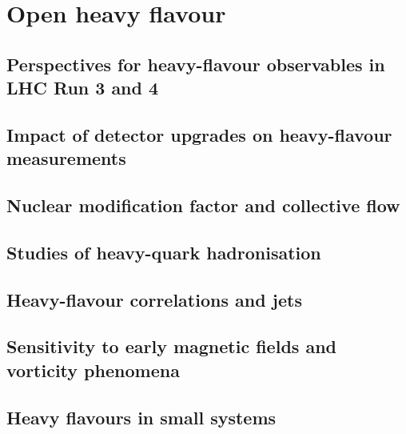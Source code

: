 \documentclass[../report.tex]{subfiles}
\providecommand{\main}{..}
\begin{document}
\section{Open heavy flavour}
\label{sec:HI_HF}


\subsection{Perspectives for heavy-flavour observables in LHC Run 3 and 4}


\subsection{Impact of detector upgrades on heavy-flavour measurements}


\subsection{Nuclear modification factor and collective flow}


\subsection{Studies of heavy-quark hadronisation}


\subsection{Heavy-flavour correlations and jets}


\subsection{Sensitivity to early magnetic fields and vorticity phenomena}



\subsection{Heavy flavours in small systems}



% 
\end{document}
